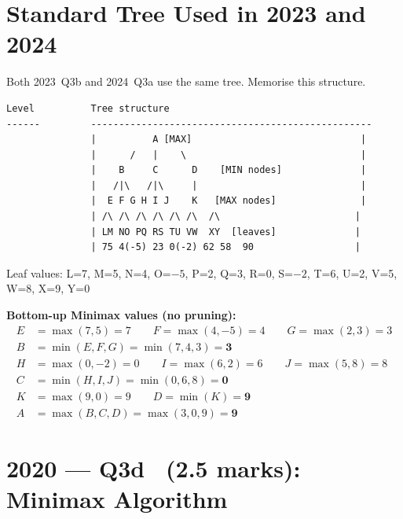\documentclass[12pt, a4paper]{article}
\newenvironment{solutionbox}{\begin{mdframed}[style=solutionframe]}{\end{mdframed}}
\begin{document}
\vspace{8pt}

\section{Standard Tree Used in 2023 and 2024}

Both 2023~Q3b and 2024~Q3a use the same tree. Memorise this structure.

\begin{solutionbox}
\begin{verbatim}
Level          Tree structure
------         --------------------------------------------------
               |          A [MAX]                              |
               |      /   |    \                               |
               |    B     C      D    [MIN nodes]              |
               |   /|\   /|\     |                             |
               |  E F G H I J    K   [MAX nodes]               |
               | /\ /\ /\ /\ /\ /\  /\                        |
               | LM NO PQ RS TU VW  XY  [leaves]              |
               | 75 4(-5) 23 0(-2) 62 58  90                  |
\end{verbatim}
Leaf values: L=7, M=5, N=4, O=$-5$, P=2, Q=3, R=0, S=$-2$, T=6, U=2, V=5, W=8, X=9, Y=0
\end{solutionbox}

\textbf{Bottom-up Minimax values (no pruning):}
\begin{align*}
E &= \max(7,5) = 7 \qquad F = \max(4,-5) = 4 \qquad G = \max(2,3) = 3\\
B &= \min(E,F,G) = \min(7,4,3) = \mathbf{3}\\[4pt]
H &= \max(0,-2) = 0 \qquad I = \max(6,2) = 6 \qquad J = \max(5,8) = 8\\
C &= \min(H,I,J) = \min(0,6,8) = \mathbf{0}\\[4pt]
K &= \max(9,0) = 9 \qquad D = \min(K) = \mathbf{9}\\[4pt]
A &= \max(B,C,D) = \max(3,0,9) = \mathbf{9}
\end{align*}

\section{2020 --- Q3d \ \normalfont(2.5 marks): Minimax Algorithm}
\end{document}
